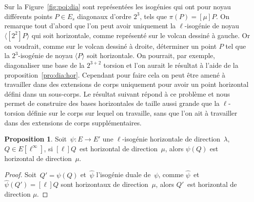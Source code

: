 \documentclass[10pt,a4paper]{book}
\theoremstyle{plain}
\theoremstyle{definition}
\theoremstyle{definition}
\theoremstyle{definition}
\theoremstyle{definition}
\newtheorem{prop}[thm]{Proposition}
\theoremstyle{definition}
\theoremstyle{remark}
\theoremstyle{remark}
\theoremstyle{definition}
\begin{document}
Sur la Figure~\ref{fig:poi:dia} sont représentées les isogénies qui ont pour
noyau différents points $P \in E_s $ diagonaux d'ordre $2^3$, tels que $\pi(P)=
[\mu]P$. On remarque tout d'abord que l'on peut avoir
uniquement la $\ell$-isogénie de noyau $\langle [2^2]P \rangle$ qui soit 
horizontale, comme représenté sur le volcan dessiné à gauche. Or on voudrait, 
comme sur le volcan dessiné à droite, déterminer un point $P$ tel que la 
$2^3$-isogénie de noyau $\langle P \rangle$ soit horizontale. On pourrait, par 
exemple, diagonaliser une base de la $2^{3+2}$ torsion et l'on 
aurait le résultat à l'aide de la proposition~\ref{pro:dia:hor}. Cependant pour
faire cela on peut être amené à travailler dans des extensions de corps 
uniquement pour avoir un point horizontal défini dans un sous-corps. Le 
résultat suivant répond à ce problème et nous permet de construire des bases 
horizontales de taille aussi grande que la $\ell$-torsion définie sur le corps 
sur lequel on travaille, sans que l'on ait à travailler dans des extensions de 
corps supplémentaires.

\begin{prop}\label{pro:pus:hor}
Soit~$\psi: E \rightarrow E'$ une $\ell$-isogénie horizontale de direction~$\lambda$,
$Q \in E[\ell^{\infty}]$,
si $[\ell] Q$~est horizontal de direction~$\mu$,
alors $\psi(Q)$ est horizontal de direction~$\mu$.
\end{prop}
\begin{proof}
Soit~$Q' = \psi(Q)$ et~$\widehat{\psi}$ l'isogénie duale de~$\psi$, 
comme $\widehat{\psi}$~et~$\widehat{\psi}(Q') = [\ell]Q$ sont horizontaux
de direction~$\mu$, alors $Q'$~est horizontal de direction $\mu$.
\end{proof}
\end{document}
